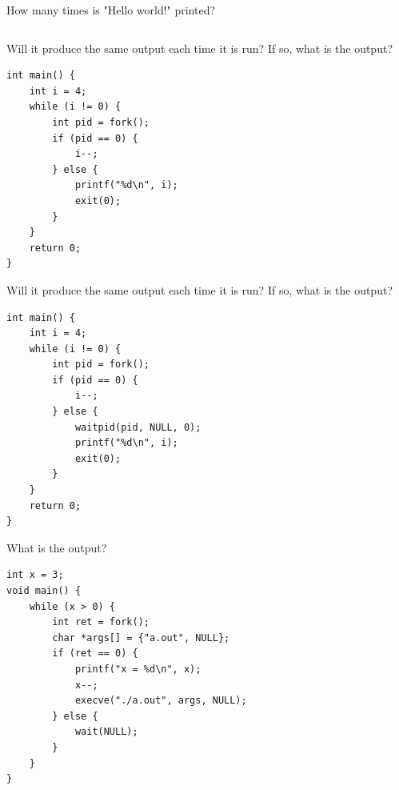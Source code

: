  \begin{slide}


	How many times is "Hello world!" printed?
	\medskip
	
    \inputminted{c}{fork_example_1_2.c}
    
\end{slide}

\begin{slide}


    Will it produce the same output each time it is run? If so, what is the output?
    
\medskip

\begin{verbatim}
int main() {
    int i = 4;
    while (i != 0) {
        int pid = fork();
        if (pid == 0) {
            i--;
        } else {
            printf("%d\n", i);
            exit(0);
        }
    }
    return 0;
}
\end{verbatim}
\end{slide}

\begin{slide}


    Will it produce the same output each time it is run? If so, what is the output?
\bigskip

    \begin{verbatim}
int main() {
    int i = 4;
    while (i != 0) {
        int pid = fork();
        if (pid == 0) {
            i--;
        } else {
            waitpid(pid, NULL, 0);
            printf("%d\n", i);
            exit(0);
        }
    }
    return 0;
}
    \end{verbatim}

\end{slide}

\begin{slide}

    
    What is the output?
    \medskip
    
    \begin{verbatim}
int x = 3; 
void main() {
    while (x > 0) {
        int ret = fork();
        char *args[] = {"a.out", NULL};
        if (ret == 0) {
            printf("x = %d\n", x);
            x--;
            execve("./a.out", args, NULL);
        } else {
            wait(NULL);
        }
    }
}
    \end{verbatim}
    
\end{slide}

